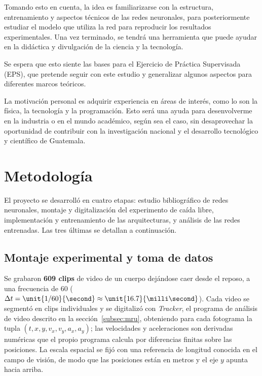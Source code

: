 \documentclass[titlepage,11pt]{article}
\begin{document}
Tomando esto en cuenta, la idea es familiarizarse con la estructura,
entrenamiento y aspectos técnicos de las redes neuronales, para posteriormente
estudiar el modelo que utiliza la red para reproducir los resultados
experimentales. Una vez terminado, se tendrá una herramienta que puede ayudar
en la didáctica y divulgación de la ciencia y la tecnología.

Se espera que esto siente las bases para el Ejercicio de Práctica Supervisada
(EPS), que pretende seguir con este estudio y generalizar algunos aspectos para
diferentes marcos teóricos.

La motivación personal es adquirir experiencia en áreas de interés,
como lo son la física, la tecnología y la programación. Esto será una ayuda
para desenvolverme en la industria o en el mundo académico, según sea el caso,
sin desaprovechar la oportunidad de contribuir con la investigación nacional y
el desarrollo tecnológico y científico de Guatemala.


\section{Metodología}
\label{sec:metodologia}

El proyecto se desarrolló en cuatro etapas: estudio bibliográfico de redes
neuronales, montaje y digitalización del experimento de caída libre,
implementación y entrenamiento de las arquitecturas, y análisis de las redes
entrenadas. Las tres últimas se detallan a continuación.

\subsection{Montaje experimental y toma de datos}
\label{sec:datos}

Se grabaron \textbf{609 clips} de video de un cuerpo dejándose caer desde el
reposo, a una frecuencia de \unit{60}{\hertz} ($\Delta t = \unit{1/60}{\second}
\approx \unit{16.7}{\milli\second}$). Cada video se segmentó en clips
individuales y se digitalizó con \emph{Tracker}, el programa de análisis de video descrito
en la sección~\ref{subsec:mru}, obteniendo para cada
fotograma la tupla $(t,x,y,v_x,v_y,a_x,a_y)$; las velocidades y aceleraciones
son derivadas numéricas que el propio programa calcula por diferencias finitas
sobre las posiciones. La escala espacial se fijó con una referencia de longitud
conocida en el campo de visión, de modo que las posiciones están en metros y el
eje $y$ apunta hacia arriba.
\end{document}
